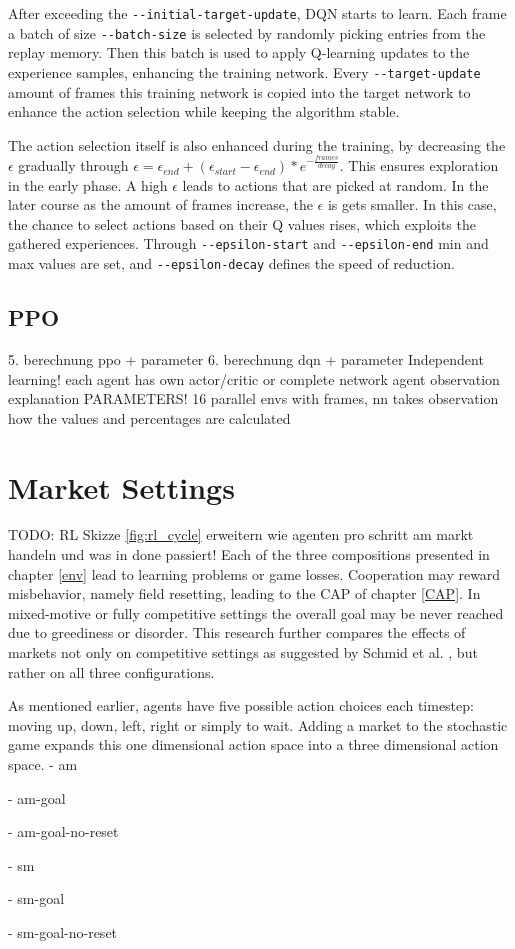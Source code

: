 After exceeding the \verb|--initial-target-update|, DQN starts to learn. Each frame a batch of size \verb|--batch-size| is selected by randomly picking entries from the replay memory. Then this batch is used to apply Q-learning updates to the experience samples, enhancing the training network. Every \verb|--target-update| amount of frames this training network is copied into the target network to enhance the action selection while keeping the algorithm stable.

The action selection itself is also enhanced during the training, by decreasing the $\epsilon$ gradually through $\epsilon = \epsilon_{end}+(\epsilon_{start}-\epsilon_{end})*e^{-\frac{frames}{decay}}$. This ensures exploration in the early phase. A high $\epsilon$ leads to actions that are picked at random. In the later course as the amount of frames increase, the $\epsilon$ is gets smaller. In this case, the chance to select actions based on their Q values rises, which exploits the gathered experiences. Through \verb|--epsilon-start| and \verb|--epsilon-end| min and max values are set, and \verb|--epsilon-decay| defines the speed of reduction.

\subsection{PPO}
5. berechnung ppo + parameter
6. berechnung dqn + parameter
Independent learning! each agent has own actor/critic or complete network
agent observation explanation
PARAMETERS!
16 parallel envs with frames,
nn takes observation
how the values and percentages are calculated

\section{Market Settings}\label{market_settings} %
TODO: RL Skizze \ref{fig:rl_cycle} erweitern wie agenten pro schritt am markt handeln und was in done passiert!
Each of the three compositions presented in chapter \ref{env} lead to learning problems or game losses. Cooperation may reward misbehavior, namely field resetting, leading to the CAP of chapter \ref{CAP}. In mixed-motive or fully competitive settings the overall goal may be never reached due to greediness or disorder. This research further compares the effects of markets not only on competitive settings as suggested by Schmid et al. \cite{scbe21}, but rather on all three configurations.

As mentioned earlier, agents have five possible action choices each timestep: moving up, down, left, right or simply to wait. Adding a market to the stochastic game expands this one dimensional action space into a three dimensional action space.
- am

- am-goal

- am-goal-no-reset

- sm

- sm-goal

- sm-goal-no-reset

